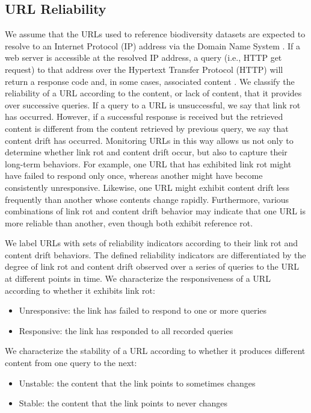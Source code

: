 \subsection*{URL Reliability}
We assume that the URLs used to reference biodiversity datasets are expected to resolve to an Internet Protocol (IP) \citep{rfc791} address via the Domain Name System \citep{rfc1034}. If a web server is accessible at the resolved IP address, a query (i.e., HTTP get request) to that address over the Hypertext Transfer Protocol (HTTP) will return a response code and, in some cases, associated content \citep{rfc3986}. We classify the reliability of a URL according to the content, or lack of content, that it provides over successive queries. If a query to a URL is unsuccessful, we say that link rot has occurred. However, if a successful response is received but the retrieved content is different from the content retrieved by previous query, we say that content drift has occurred. Monitoring URLs in this way allows us not only to determine whether link rot and content drift occur, but also to capture their long-term behaviors. For example, one URL that has exhibited link rot might have failed to respond only once, whereas another might have become consistently unresponsive. Likewise, one URL might exhibit content drift less frequently than another whose contents change rapidly. Furthermore, various combinations of link rot and content drift behavior may indicate that one URL is more reliable than another, even though both exhibit reference rot.

We label URLs with sets of reliability indicators according to their link rot and content drift behaviors. The defined reliability indicators are differentiated by the degree of link rot and content drift observed over a series of queries to the URL at different points in time. We characterize the responsiveness of a URL according to whether it exhibits link rot:

\begin{itemize}
 \item Unresponsive: the link has failed to respond to one or more queries
 \item Responsive: the link has responded to all recorded queries
\end{itemize}

We characterize the stability of a URL according to whether it produces different content from one query to the next:

\begin{itemize}
 \item Unstable: the content that the link points to sometimes changes
 \item Stable: the content that the link points to never changes
\end{itemize}


